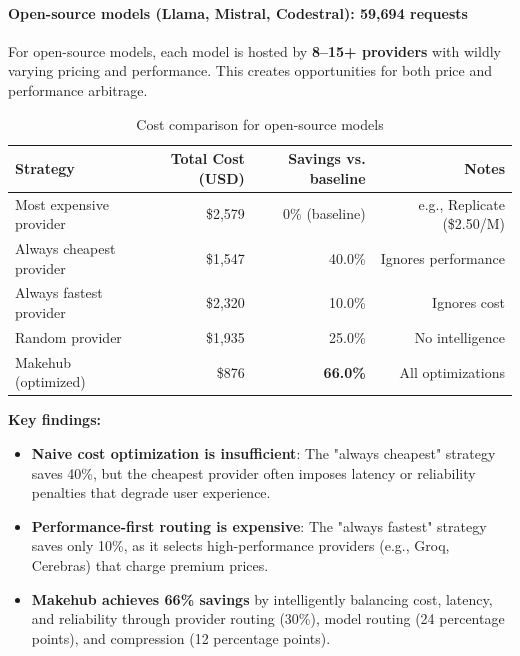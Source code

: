 \documentclass[english]{article}
\begin{document}
\paragraph{Open-source models (Llama, Mistral, Codestral): 59,694 requests}

For open-source models, each model is hosted by \textbf{8--15+ providers} with wildly varying pricing and performance. This creates opportunities for both price and performance arbitrage.

\begin{table}[H]
\centering
\caption{Cost comparison for open-source models}
\label{tab:cost_comparison_opensource}
\begin{tabular}{|l|r|r|r|}
\hline
\textbf{Strategy} & \textbf{Total Cost (USD)} & \textbf{Savings vs. baseline} & \textbf{Notes} \\
\hline
Most expensive provider & \$2,579 & 0\% (baseline) & e.g., Replicate (\$2.50/M) \\
\hline
Always cheapest provider & \$1,547 & 40.0\% & Ignores performance \\
\hline
Always fastest provider & \$2,320 & 10.0\% & Ignores cost \\
\hline
Random provider & \$1,935 & 25.0\% & No intelligence \\
\hline
Makehub (optimized) & \$876 & \textbf{66.0\%} & All optimizations \\
\hline
\end{tabular}
\end{table}

\medskip

\noindent\textbf{Key findings:}
\begin{itemize}
\item \textbf{Naive cost optimization is insufficient}: The "always cheapest" strategy saves 40\%, but the cheapest provider often imposes latency or reliability penalties that degrade user experience.

\item \textbf{Performance-first routing is expensive}: The "always fastest" strategy saves only 10\%, as it selects high-performance providers (e.g., Groq, Cerebras) that charge premium prices.

\item \textbf{Makehub achieves 66\% savings} by intelligently balancing cost, latency, and reliability through provider routing (30\%), model routing (24 percentage points), and compression (12 percentage points).
\end{itemize}
\end{document}
